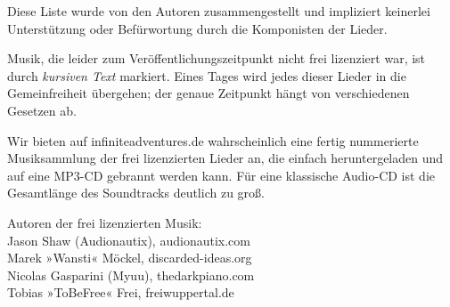 Diese Liste wurde von den Autoren zusammengestellt und impliziert keinerlei Unterstützung oder Befürwortung durch die Komponisten der Lieder.

Musik, die leider zum Veröffentlichungszeitpunkt nicht frei lizenziert war, ist durch \textit{kursiven Text} markiert. Eines Tages wird jedes dieser Lieder in die Gemeinfreiheit übergehen; der genaue Zeitpunkt hängt von verschiedenen Gesetzen ab.

Wir bieten auf infiniteadventures.de wahrscheinlich eine fertig nummerierte Musiksammlung der frei lizenzierten Lieder an, die einfach heruntergeladen und auf eine MP3-CD gebrannt werden kann. Für eine klassische Audio-CD ist die Gesamtlänge des Soundtracks deutlich zu groß.

Autoren der frei lizenzierten Musik:\\
Jason Shaw (Audionautix), audionautix.com\\
Marek »Wansti« Möckel, discarded-ideas.org\\
Nicolas Gasparini (Myuu), thedarkpiano.com\\
Tobias »ToBeFree« Frei, freiwuppertal.de

